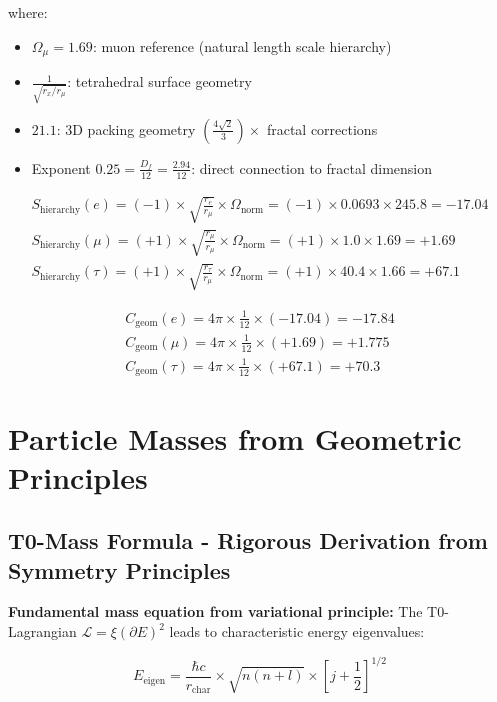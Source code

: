 \documentclass[12pt,a4paper]{article}
\numberwithin{equation}{section}
\newcommand{\xipar}{\xi}
\newcommand{\Cgeom}{C_{\text{geom}}}
\newcommand{\calL}{\mathcal{L}}
\newcommand{\Df}{D_f}
\newcommand{\Omegafactor}{\Omega}
\begin{document}
	where:
	\begin{itemize}
		\item $\Omega_\mu = 1.69$: muon reference (natural length scale hierarchy)
		\item $\frac{1}{\sqrt{r_x/r_\mu}}$: tetrahedral surface geometry
		\item $21.1$: 3D packing geometry $\left(\frac{4\sqrt{2}}{3}\right) \times$ fractal corrections
		\item Exponent $0.25 = \frac{\Df}{12} = \frac{2.94}{12}$: direct connection to fractal dimension
	\end{itemize}
	
	\begin{align}
		S_{\text{hierarchy}}(e) = (-1) \times \sqrt{\frac{r_e}{r_\mu}} \times \Omegafactor_{\text{norm}} = (-1) \times 0.0693 \times 245.8 = -17.04\\
		S_{\text{hierarchy}}(\mu) = (+1) \times \sqrt{\frac{r_\mu}{r_\mu}} \times \Omegafactor_{\text{norm}} = (+1) \times 1.0 \times 1.69 = +1.69\\
		S_{\text{hierarchy}}(\tau) = (+1) \times \sqrt{\frac{r_\tau}{r_\mu}} \times \Omegafactor_{\text{norm}} = (+1) \times 40.4 \times 1.66 = +67.1
		\label{eq:signature_factors}
	\end{align}
	
	\begin{align}
		\Cgeom(e) = 4\pi \times \frac{1}{12} \times (-17.04) = -17.84\\
		\Cgeom(\mu) = 4\pi \times \frac{1}{12} \times (+1.69) = +1.775\\
		\Cgeom(\tau) = 4\pi \times \frac{1}{12} \times (+67.1) = +70.3
		\label{eq:cgeom_values}
	\end{align}
	
	\section{Particle Masses from Geometric Principles}
	
	\subsection{T0-Mass Formula - Rigorous Derivation from Symmetry Principles}
	
	\textbf{Fundamental mass equation from variational principle:}
	The T0-Lagrangian $\calL = \xipar(\partial E)^2$ leads to characteristic energy eigenvalues:
	
	\begin{equation}
		E_{\text{eigen}} = \frac{\hbar c}{r_{\text{char}}} \times \sqrt{n(n+l)} \times [j+\frac{1}{2}]^{1/2}
		\label{eq:energy_eigenvalues}
	\end{equation}
	
\end{document}
